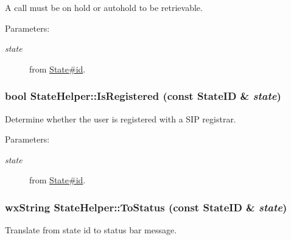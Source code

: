 A call must be on hold or autohold to be retrievable. \begin{Desc}
\item[Parameters:]
\begin{description}
\item[{\em state}]from \hyperlink{classState_f747db9527dfb6ea0a58fe7bfeb3ac80}{State\#id}. \end{description}
\end{Desc}
\hypertarget{classStateHelper_9c0a814cd8b3104a30dc9b6d5a4c1aab}{
\subsubsection[{IsRegistered}]{\setlength{\rightskip}{0pt plus 5cm}bool StateHelper::IsRegistered (const {\bf StateID} \& {\em state})}}
\label{classStateHelper_9c0a814cd8b3104a30dc9b6d5a4c1aab}


Determine whether the user is registered with a SIP registrar. 

\begin{Desc}
\item[Parameters:]
\begin{description}
\item[{\em state}]from \hyperlink{classState_f747db9527dfb6ea0a58fe7bfeb3ac80}{State\#id}. \end{description}
\end{Desc}
\hypertarget{classStateHelper_b33007a2d3887bbaff4acce948301579}{
\subsubsection[{ToStatus}]{\setlength{\rightskip}{0pt plus 5cm}wxString StateHelper::ToStatus (const {\bf StateID} \& {\em state})}}
\label{classStateHelper_b33007a2d3887bbaff4acce948301579}


Translate from state id to status bar message. 

